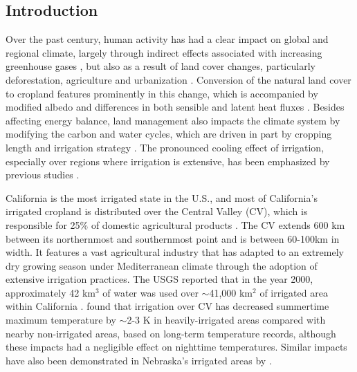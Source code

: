 \documentclass[draft,ms]{agutex}   %
\begin{document}
\begin{article}


%
\section{Introduction}

Over the past century, human activity has had a clear impact on global and regional climate, largely through indirect effects associated with increasing greenhouse gases \citep{solomon2007ipcc}, but also as a result of land cover changes, particularly deforestation, agriculture and urbanization \citep{bonan1997effects, pielke2002influence, kueppers2008seasonal}. Conversion of the natural land cover to cropland features prominently in this change, which is accompanied by modified albedo and differences in both sensible and latent heat fluxes \citep{foley2003green}. Besides affecting energy balance, land management also impacts the climate system by modifying the carbon and water cycles, which are driven in part by cropping length and irrigation strategy \citep{lobell2006biogeophysical}. The pronounced cooling effect of irrigation, especially over regions where irrigation is extensive, has been emphasized by previous studies \citep{kueppers2007irrigation, lobell2008effect}.  

California is the most irrigated state in the U.S., and most of California's irrigated cropland is distributed over the Central Valley (CV), which is responsible for 25$\%$ of domestic agricultural products \citep{wilkinson2002preparing}. The CV extends 600 km between its northernmost and southernmost point and is between 60-100km in width.  It features a vast agricultural industry that has adapted to an extremely dry growing season under Mediterranean climate through the adoption of extensive irrigation practices. The USGS reported that in the year 2000, approximately 42 km$^3$ of water was used over $\sim$41,000 km$^2$ of irrigated area within California \citep{doll2002global, famiglietti2011satellites}. \cite{bonfils2007empirical} found that irrigation over CV has decreased summertime maximum temperature by $\sim$2-3 K in heavily-irrigated areas compared with nearby non-irrigated areas, based on long-term temperature records, although these impacts had a negligible effect on nighttime temperatures. Similar impacts have also been demonstrated in Nebraska's irrigated areas by \citet{mahmood2006impacts}.


\end{article}
\end{document}
